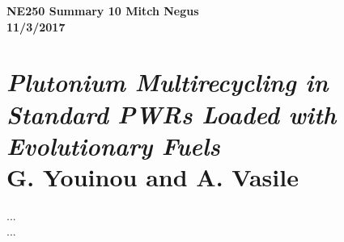 \documentclass{report}
\newcommand{\tab}{\-\hspace{1cm}}
\begin{document}
\thispagestyle{empty}

{\bf {\large {NE250 Summary {10} \hfill Mitch Negus\\
		\hspace*{\fill} 11/3/2017\\ }}}
\section*{\textsl{Plutonium Multirecycling in Standard PWRs Loaded with Evolutionary Fuels} \\ \normalsize G. Youinou and A. Vasile}

\tab ... \\
\tab ...
\end{document}
